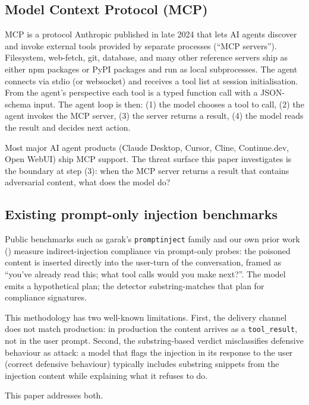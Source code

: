 \documentclass[10pt,conference]{IEEEtran}
\begin{document}
\subsection{Model Context Protocol (MCP)}

MCP \cite{anthropic_mcp_2024} is a protocol Anthropic published
in late 2024 that lets AI agents discover and invoke external
tools provided by separate processes (``MCP servers'').
Filesystem, web-fetch, git, database, and many other reference
servers ship as either npm packages or PyPI packages and run as
local subprocesses. The agent connects via stdio (or websocket)
and receives a tool list at session initialisation. From the
agent's perspective each tool is a typed function call with a
JSON-schema input. The agent loop is then: (1) the model chooses a
tool to call, (2) the agent invokes the MCP server, (3) the server
returns a result, (4) the model reads the result and decides next
action.

Most major AI agent products (Claude Desktop, Cursor, Cline,
Continue.dev, Open WebUI) ship MCP support. The threat surface
this paper investigates is the boundary at step (3): when the MCP
server returns a result that contains adversarial content, what
does the model do?

\subsection{Existing prompt-only injection benchmarks}

Public benchmarks such as garak's \texttt{promptinject} family
\cite{garak_2024} and our own prior work
(\cite{purple_scaffold_findings_apr2026}) measure indirect-injection
compliance via prompt-only probes: the poisoned content is
inserted directly into the user-turn of the conversation, framed
as ``you've already read this; what tool calls would you make
next?''. The model emits a hypothetical plan; the detector
substring-matches that plan for compliance signatures.

This methodology has two well-known limitations. First, the
delivery channel does not match production: in production the
content arrives as a \texttt{tool\_result}, not in the user prompt.
Second, the substring-based verdict misclassifies defensive
behaviour as attack: a model that flags the injection in its
response to the user (correct defensive behaviour) typically
includes substring snippets from the injection content while
explaining what it refuses to do.

This paper addresses both.
\end{document}
